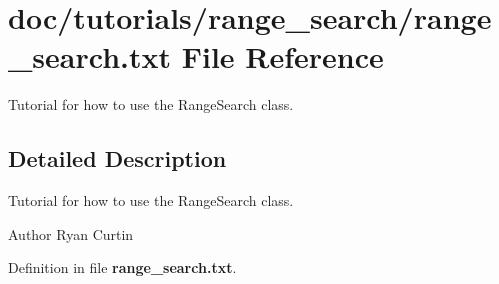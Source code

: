 \section{doc/tutorials/range\-\_\-search/range\-\_\-search.txt File Reference}
\label{range__search_8txt}


Tutorial for how to use the Range\-Search class.  




\subsection{Detailed Description}
Tutorial for how to use the Range\-Search class. \begin{DoxyAuthor}{Author}
Ryan Curtin 
\end{DoxyAuthor}


Definition in file {\bf range\-\_\-search.\-txt}.

